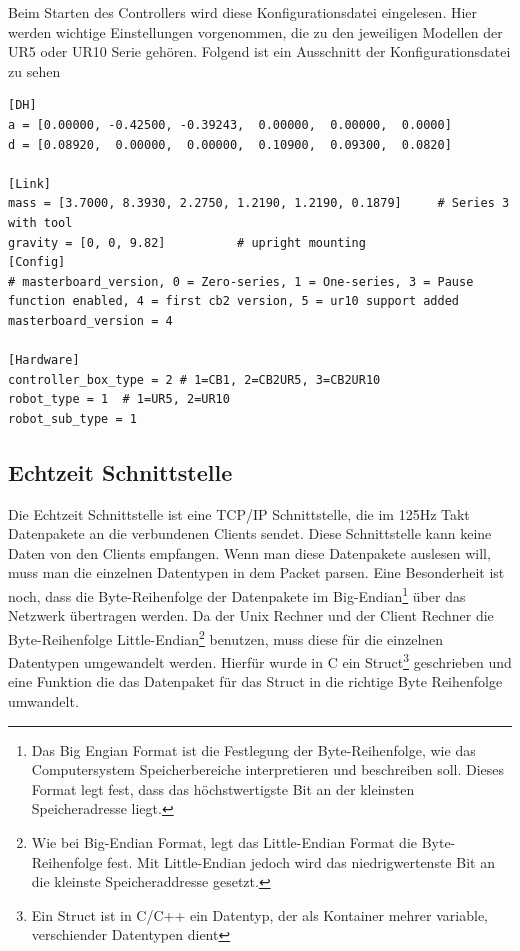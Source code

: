 Beim Starten des Controllers wird diese Konfigurationsdatei eingelesen.
Hier werden wichtige Einstellungen vorgenommen, die zu den jeweiligen Modellen der UR5 oder UR10 Serie gehören. Folgend ist ein Ausschnitt der Konfigurationsdatei zu sehen
\\
\begin{lstlisting}[caption={Ausschnitt aus der Datei urcontrol.conf zur vorkonfigurierung des UR5 Roboters}, label=lst:ur5_conf ,captionpos=b]
[DH]
a = [0.00000, -0.42500, -0.39243,  0.00000,  0.00000,  0.0000]
d = [0.08920,  0.00000,  0.00000,  0.10900,  0.09300,  0.0820]

[Link]
mass = [3.7000, 8.3930, 2.2750, 1.2190, 1.2190, 0.1879]     # Series 3 with tool
gravity = [0, 0, 9.82]          # upright mounting
[Config]
# masterboard_version, 0 = Zero-series, 1 = One-series, 3 = Pause function enabled, 4 = first cb2 version, 5 = ur10 support added
masterboard_version = 4

[Hardware]
controller_box_type = 2 # 1=CB1, 2=CB2UR5, 3=CB2UR10
robot_type = 1  # 1=UR5, 2=UR10
robot_sub_type = 1
\end{lstlisting}

\subsection{Echtzeit Schnittstelle}
\label{urcontrol_rci_gru}

Die Echtzeit Schnittstelle ist eine \acs{TCP/IP} Schnittstelle, die im 125Hz Takt Datenpakete an die verbundenen Clients sendet. Diese Schnittstelle kann keine Daten von den Clients empfangen. Wenn man diese Datenpakete auslesen will, muss man die einzelnen Datentypen in dem Packet \acs{parsen}. Eine Besonderheit ist noch, dass die Byte-Reihenfolge der Datenpakete im Big-Endian\footnote{Das Big Engian Format ist die Festlegung der Byte-Reihenfolge, wie das Computersystem Speicherbereiche interpretieren und beschreiben soll. Dieses Format legt fest, dass das höchstwertigste Bit an der kleinsten Speicheradresse liegt.} über das Netzwerk übertragen werden. Da der Unix Rechner und der Client Rechner die Byte-Reihenfolge Little-Endian\footnote{Wie bei Big-Endian Format, legt das Little-Endian Format die Byte-Reihenfolge fest. Mit Little-Endian jedoch wird das niedrigwertenste Bit an die kleinste Speicheraddresse gesetzt.} benutzen, muss diese für die einzelnen Datentypen umgewandelt werden. Hierfür wurde in C ein Struct\footnote{Ein Struct ist in C/C++ ein Datentyp, der als Kontainer mehrer variable, verschiender Datentypen dient} geschrieben und eine Funktion die das Datenpaket für das Struct in die richtige Byte Reihenfolge umwandelt.

